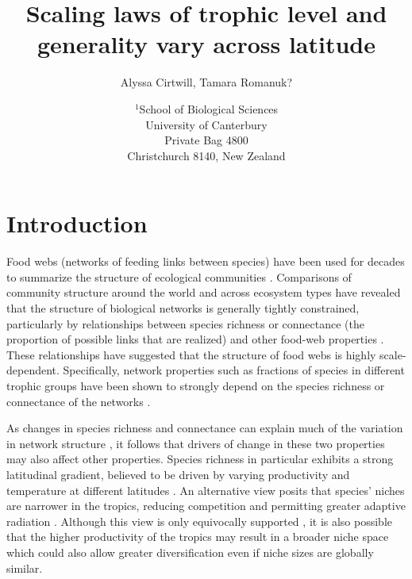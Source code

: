 \documentclass[12pt]{article}
\title{Scaling laws of trophic level and generality vary across latitude}
\author{Alyssa Cirtwill, Tamara Romanuk?}
\date{$^1$School of Biological Sciences\\University of Canterbury\\
Private Bag 4800\\Christchurch 8140, New Zealand}
\begin{document}
\maketitle
\baselineskip=8.5mm
 
\vspace{0.4 in}



\section*{Introduction}

Food webs (networks of feeding links between species) have been used for decades to summarize the structure of ecological communities \citep{Martinez2000,earlierwork}.
Comparisons of community structure around the world and across ecosystem types 
have revealed that the structure of biological networks is generally tightly
constrained, particularly by relationships between species richness or connectance
(the proportion of possible links that are realized) and other food-web properties \citep{Riede2010}.
These relationships have suggested that the structure of food webs is highly scale-dependent. 
Specifically, network properties such as fractions of species in different trophic groups 
have been shown to strongly depend on the species richness or connectance of
the networks \citep{Vermaat2009,Riede2010}. 


As changes in species richness and connectance can explain much of the variation in network structure \citep{Vermaat2009}, 
it follows that drivers of change in these two properties may also affect other properties. Species richness in particular 
exhibits a strong latitudinal gradient, believed to be driven by varying productivity and temperature at different latitudes 
\citep{Brown2004,Cardillo2005,Thompson2005,Davies2007}. An alternative view
posits that species' niches are narrower in the tropics, 
reducing competition and permitting greater adaptive radiation \citep{}. Although this view is only equivocally supported 
\citep{Vazquez2004}, it is also possible that the higher productivity of the tropics \citep{Brown2004} may result in a broader 
niche space \citep{Davies2007} which could also allow greater diversification even if niche sizes are globally similar.
\end{document}
